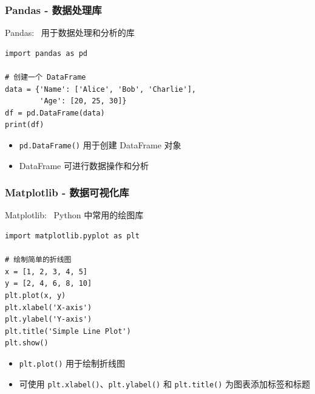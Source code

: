 \begin{frame}[fragile]
	\frametitle{\textrm{Pandas} - 数据处理库}
	\textrm{Pandas}:~ 用于数据处理和分析的库\\
	{\fontsize{8.5pt}{4.2pt}}
    \begin{lstlisting}[style=pythonstyle]
import pandas as pd

# 创建一个 DataFrame
data = {'Name': ['Alice', 'Bob', 'Charlie'],
        'Age': [20, 25, 30]}
df = pd.DataFrame(data)
print(df)
    \end{lstlisting}
    \begin{itemize}
	    \item \texttt{pd.DataFrame()} 用于创建 \textrm{DataFrame} 对象
	    \item \textrm{DataFrame} 可进行数据操作和分析
    \end{itemize}
\end{frame}

\begin{frame}[fragile]
	\frametitle{\textrm{Matplotlib} - 数据可视化库}
	\textrm{Matplotlib}:~ \textrm{Python} 中常用的绘图库
	{\fontsize{8.5pt}{4.2pt}\selectfont{用于创建各种类型的图表}}
    \begin{lstlisting}[style=pythonstyle]
import matplotlib.pyplot as plt

# 绘制简单的折线图
x = [1, 2, 3, 4, 5]
y = [2, 4, 6, 8, 10]
plt.plot(x, y)
plt.xlabel('X-axis')
plt.ylabel('Y-axis')
plt.title('Simple Line Plot')
plt.show()
    \end{lstlisting}
    \begin{itemize}
        \item \texttt{plt.plot()} 用于绘制折线图
        \item 可使用 \texttt{plt.xlabel()}、\texttt{plt.ylabel()} 和 \texttt{plt.title()} 为图表添加标签和标题
    \end{itemize}
\end{frame}
